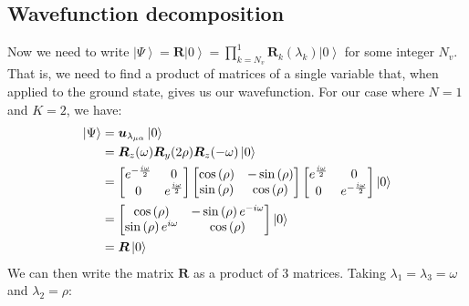 \documentclass{aux/ttuthes2007}
\newcommand{\ket}[1]{\ensuremath{\left|#1\right\rangle}}
\newcommand{\s}[1]{\sin\left( #1 \right)}
\newcommand{\co}[1]{\cos\left( #1 \right)}
\newcommand{\elec}{N}
\newcommand{\orb}{K}
\newcommand{\ind}[1]{{\uo #1 \oo #1}}
\newcommand{\uo}[1]{
		\IfEqCase{#1}{
			{0}{\mu}
			{1}{\nu}
			{2}{\xi}
		}[\PackageError{uo}{Undefined option to uo: #1}{}]
}
\newcommand{\oo}[1]{
		\IfEqCase{#1}{
			{0}{\alpha}
			{1}{\beta}
			{2}{\gamma}
		}[\PackageError{unocorb}{Undefined option to unuo: #1}{}]
}
\begin{document}
\subsection {\textbf{Wavefunction decomposition}}
Now we need to write $\ket \Psi = \bm R \ket 0 = \prod_{k=N_v}^1 \bm R_k(\lambda_k) \ket 0$ for some integer $N_v$. That is, we need to find a product of matrices of a single variable that, when applied to the ground state, gives us our wavefunction.
For our case where $\elec = 1$ and $\orb = 2$, we have:
%
\begin{equation*}
\begin{split}
	\ket\Psi 
	&= \bm u_{\lambda_{\ind 0}} \ket 0 \\
	&= \bm R_z(\omega) \bm R_y(2\rho) \bm R_z(-\omega)
	\ket 0 \\
	&= 
	\begin{bmatrix}
		e^{-\frac{i\omega} 2} & 0 \\
		0 & e^{\frac{i\omega} 2}\\
	\end{bmatrix} 
	\begin{bmatrix}
		\co \rho & - \s \rho \\
		\s \rho  & \co \rho\\
	\end{bmatrix} 
	\begin{bmatrix}
		e^{\frac{i\omega} 2} & 0 \\
		0 & e^{-\frac{i\omega} 2}\\
	\end{bmatrix} 
	\ket 0 \\
	&=
	\begin{bmatrix}
		\co \rho & - \s \rho e^{-i\omega} \\
		\s \rho e^{i\omega} & \co \rho\\
	\end{bmatrix} 
	\ket 0 \\
	&= \bm R\ket 0
\end{split}
\end{equation*}
%
We can then write the matrix $\bm R$ as a product of 3 matrices. Taking $\lambda_1 = \lambda_3 = \omega$ and $\lambda_2 = \rho$:
%
\end{document}
